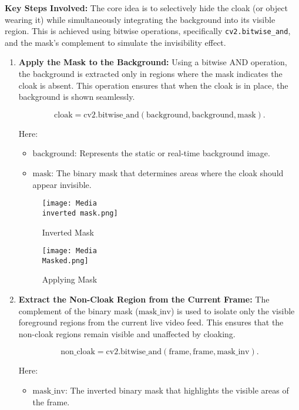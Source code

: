 \documentclass[onecolumn]{article} %
\begin{document}
\textbf{Key Steps Involved:}  
The core idea is to selectively hide the cloak (or object wearing it) while simultaneously integrating the background into its visible region. This is achieved using bitwise operations, specifically \texttt{cv2.bitwise\_and}, and the mask's complement to simulate the invisibility effect.

\begin{enumerate}
    \item \textbf{Apply the Mask to the Background:}  
    Using a bitwise AND operation, the background is extracted only in regions where the mask indicates the cloak is absent. This operation ensures that when the cloak is in place, the background is shown seamlessly.

    \[
    \text{cloak} = \text{cv2.bitwise\_and}(\text{background}, \text{background}, \text{mask}).
    \]

    Here:
    \begin{itemize}
        \item \(\text{background}\): Represents the static or real-time background image.
        \item \(\text{mask}\): The binary mask that determines areas where the cloak should appear invisible.
    \end{itemize}

\begin{figure}[h!]
    \centering
    \texttt{[image: Media\\inverted mask.png]}
    \caption{Inverted Mask}
    \label{fig:Inverted Mask}
\end{figure}

\begin{figure}[h!]
    \centering
    \texttt{[image: Media\\Masked.png]}
    \caption{Applying Mask}
    \label{fig:Applying Mask}
\end{figure}

    \item \textbf{Extract the Non-Cloak Region from the Current Frame:}  
    The complement of the binary mask (\(\text{mask\_inv}\)) is used to isolate only the visible foreground regions from the current live video feed. This ensures that the non-cloak regions remain visible and unaffected by cloaking.

    \[
    \text{non\_cloak} = \text{cv2.bitwise\_and}(\text{frame}, \text{frame}, \text{mask\_inv}).
    \]

    Here:
    \begin{itemize}
        \item \(\text{mask\_inv}\): The inverted binary mask that highlights the visible areas of the frame.
    \end{itemize}


\end{enumerate}
\end{document}

